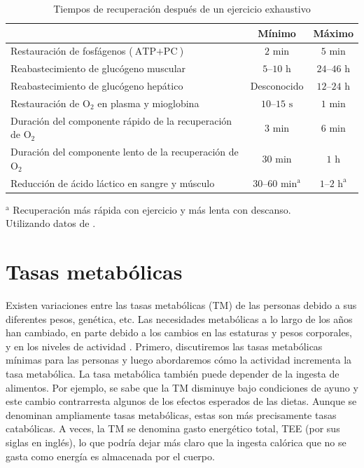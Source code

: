 \documentclass[12pt]{book}
\begin{document}
\begin{table}[htbp]
\centering
\caption{Tiempos de recuperación después de un ejercicio exhaustivo}
\label{tab:616}
\small
\begin{tabularx}{\textwidth}{Xcc}
\toprule
 & \textbf{Mínimo} & \textbf{Máximo} \\
\midrule
Restauración de fosfágenos ($\text{ATP} + \text{PC}$) & $2\text{ min}$ & $5\text{ min}$ \\
Reabastecimiento de glucógeno muscular & $5\text{--}10\text{ h}$ & $24\text{--}46\text{ h}$ \\
Reabastecimiento de glucógeno hepático & Desconocido & $12\text{--}24\text{ h}$ \\
Restauración de $\text{O}_2$ en plasma y mioglobina & $10\text{--}15\text{ s}$ & $1\text{ min}$ \\
Duración del componente rápido de la recuperación de $\text{O}_2$ & $3\text{ min}$ & $6\text{ min}$ \\
Duración del componente lento de la recuperación de $\text{O}_2$ & $30\text{ min}$ & $1\text{ h}$ \\
Reducción de ácido láctico en sangre y músculo & $30\text{--}60\text{ min}^{\text{a}}$ & $1\text{--}2\text{ h}^{\text{a}}$ \\
\bottomrule
\end{tabularx}
\begin{flushleft}
    \small $^{\text{a}}$ Recuperación más rápida con ejercicio y más lenta con descanso.\\
    Utilizando datos de \cite{35}.
\end{flushleft}
\end{table}

\section{Tasas metabólicas}

Existen variaciones entre las tasas metabólicas (TM) de las personas debido a sus diferentes pesos, genética, etc. Las necesidades metabólicas a lo largo de los años han cambiado, en parte debido a los cambios en las estaturas y pesos corporales, y en los niveles de actividad \cite{34}. Primero, discutiremos las tasas metabólicas mínimas para las personas y luego abordaremos cómo la actividad incrementa la tasa metabólica. La tasa metabólica también puede depender de la ingesta de alimentos. Por ejemplo, se sabe que la TM disminuye bajo condiciones de ayuno y este cambio contrarresta algunos de los efectos esperados de las dietas. Aunque se denominan ampliamente tasas metabólicas, estas son más precisamente tasas catabólicas. A veces, la TM se denomina gasto energético total, TEE (por sus siglas en inglés), lo que podría dejar más claro que la ingesta calórica que no se gasta como energía es almacenada por el cuerpo.
\end{document}
